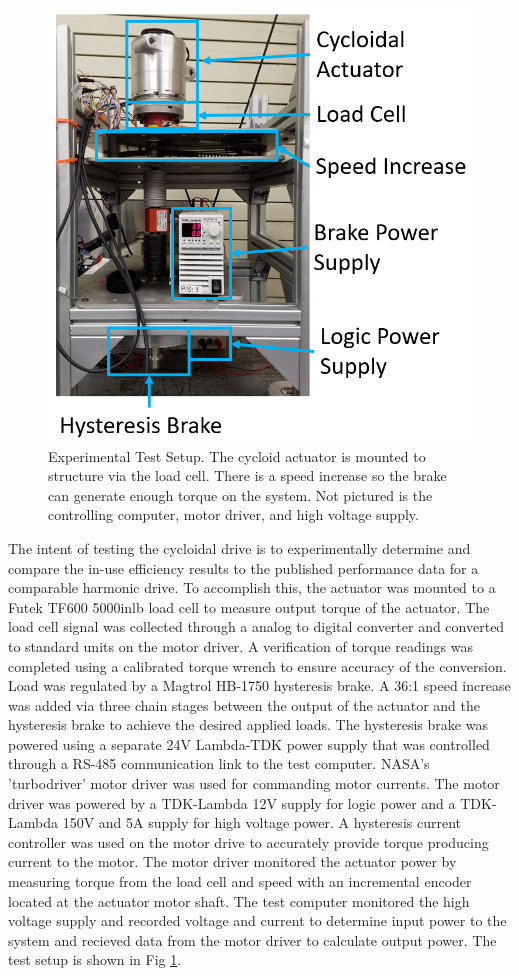 \begin{figure}[!b]
   \centering
   \includegraphics[width=0.75\linewidth]{images/test_stand}
   \caption{Experimental Test Setup.
   The cycloid actuator is mounted to structure via the load cell.
   There is a speed increase so the brake can generate enough torque on the system.
   Not pictured is the controlling computer, motor driver, and high voltage supply.}
   \label{test_setup}
\end{figure}

The intent of testing the cycloidal drive is to experimentally determine and compare the in-use efficiency results to the published performance data for a comparable harmonic drive.
To accomplish this, the actuator was mounted to a Futek TF600 5000inlb load cell to measure output torque of the actuator.
The load cell signal was collected through a analog to digital converter and converted to standard units on the motor driver.
A verification of torque readings was completed using a calibrated torque wrench to ensure accuracy of the conversion.
Load was regulated by a Magtrol HB-1750 hysteresis brake.
A 36:1 speed increase was added via three chain stages between the output of the actuator and the hysteresis brake to achieve the desired applied loads.
The hysteresis brake was powered using a separate 24V Lambda-TDK power supply that was controlled through a RS-485 communication link to the test computer.
NASA's 'turbodriver' motor driver was used for commanding motor currents.
The motor driver was powered by a TDK-Lambda 12V supply for logic power and a TDK-Lambda 150V and 5A supply for high voltage power.
A hysteresis current controller was used on the motor drive to accurately provide torque producing current to the motor.
The motor driver monitored the actuator power by measuring torque from the load cell and speed with an incremental encoder located at the actuator motor shaft.
The test computer monitored the high voltage supply and recorded voltage and current to determine input power to the system and recieved data from the motor driver to calculate output power.
The test setup is shown in Fig \ref{test_setup}.


